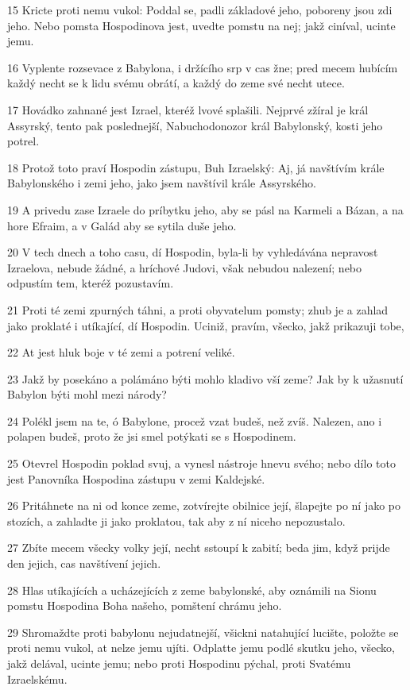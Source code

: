 \par 15 Kricte proti nemu vukol: Poddal se, padli základové jeho, poboreny jsou zdi jeho. Nebo pomsta Hospodinova jest, uvedte pomstu na nej; jakž ciníval, ucinte jemu.
\par 16 Vyplente rozsevace z Babylona, i držícího srp v cas žne; pred mecem hubícím každý necht se k lidu svému obrátí, a každý do zeme své necht utece.
\par 17 Hovádko zahnané jest Izrael, kteréž lvové splašili. Nejprvé zžíral je král Assyrský, tento pak poslednejší, Nabuchodonozor král Babylonský, kosti jeho potrel.
\par 18 Protož toto praví Hospodin zástupu, Buh Izraelský: Aj, já navštívím krále Babylonského i zemi jeho, jako jsem navštívil krále Assyrského.
\par 19 A privedu zase Izraele do príbytku jeho, aby se pásl na Karmeli a Bázan, a na hore Efraim, a v Galád aby se sytila duše jeho.
\par 20 V tech dnech a toho casu, dí Hospodin, byla-li by vyhledávána nepravost Izraelova, nebude žádné, a hríchové Judovi, však nebudou nalezení; nebo odpustím tem, kteréž pozustavím.
\par 21 Proti té zemi zpurných táhni, a proti obyvatelum pomsty; zhub je a zahlad jako proklaté i utíkající, dí Hospodin. Uciniž, pravím, všecko, jakž prikazuji tobe,
\par 22 At jest hluk boje v té zemi a potrení veliké.
\par 23 Jakž by posekáno a polámáno býti mohlo kladivo vší zeme? Jak by k užasnutí Babylon býti mohl mezi národy?
\par 24 Polékl jsem na te, ó Babylone, procež vzat budeš, než zvíš. Nalezen, ano i polapen budeš, proto že jsi smel potýkati se s Hospodinem.
\par 25 Otevrel Hospodin poklad svuj, a vynesl nástroje hnevu svého; nebo dílo toto jest Panovníka Hospodina zástupu v zemi Kaldejské.
\par 26 Pritáhnete na ni od konce zeme, zotvírejte obilnice její, šlapejte po ní jako po stozích, a zahladte ji jako proklatou, tak aby z ní niceho nepozustalo.
\par 27 Zbíte mecem všecky volky její, necht sstoupí k zabití; beda jim, když prijde den jejich, cas navštívení jejich.
\par 28 Hlas utíkajících a ucházejících z zeme babylonské, aby oznámili na Sionu pomstu Hospodina Boha našeho, pomštení chrámu jeho.
\par 29 Shromaždte proti babylonu nejudatnejší, všickni natahující lucište, položte se proti nemu vukol, at nelze jemu ujíti. Odplatte jemu podlé skutku jeho, všecko, jakž delával, ucinte jemu; nebo proti Hospodinu pýchal, proti Svatému Izraelskému.
